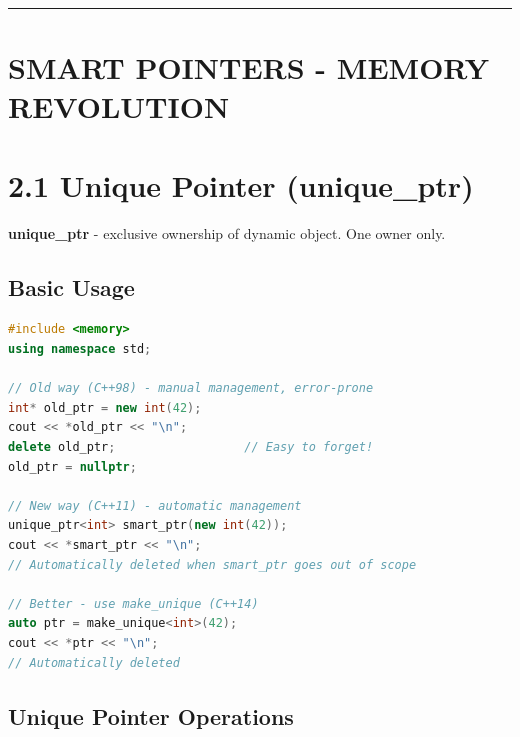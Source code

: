 \begin{center}\rule{0.5\linewidth}{0.5pt}\end{center}

\hypertarget{smart-pointers---memory-revolution}{%
\section{SMART POINTERS - MEMORY
REVOLUTION}\label{smart-pointers---memory-revolution}}

\hypertarget{unique-pointer-unique_ptr}{%
\section{2.1 Unique Pointer
(unique\_ptr)}\label{unique-pointer-unique_ptr}}

\textbf{unique\_ptr} - exclusive ownership of dynamic object. One owner
only.

\hypertarget{basic-usage}{%
\subsection{Basic Usage}\label{basic-usage}}

\begin{lstlisting}[language={C++}]
#include <memory>
using namespace std;

// Old way (C++98) - manual management, error-prone
int* old_ptr = new int(42);
cout << *old_ptr << "\n";
delete old_ptr;                  // Easy to forget!
old_ptr = nullptr;

// New way (C++11) - automatic management
unique_ptr<int> smart_ptr(new int(42));
cout << *smart_ptr << "\n";
// Automatically deleted when smart_ptr goes out of scope

// Better - use make_unique (C++14)
auto ptr = make_unique<int>(42);
cout << *ptr << "\n";
// Automatically deleted
\end{lstlisting}

\hypertarget{unique-pointer-operations}{%
\subsection{Unique Pointer Operations}\label{unique-pointer-operations}}

